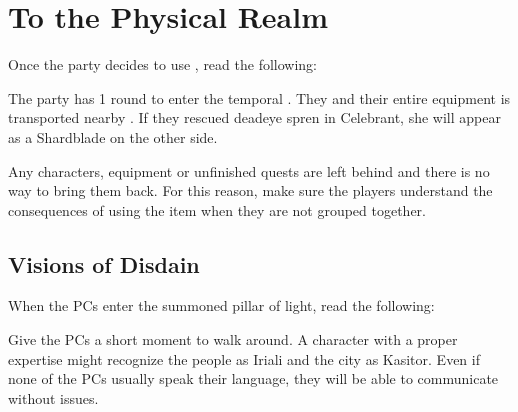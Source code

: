 \section{To the Physical Realm}
\label{sec:toThePhysicalRealm}

Once the party decides to use \lootGateOpener{}, read the following:


The party has 1 round to enter the temporal \locationPerpendicularity{}. They and their entire equipment is transported nearby \locationKharbranth{}. If they rescued deadeye spren in Celebrant, she will appear as a Shardblade on the other side.

Any characters, equipment or unfinished quests are left behind and there is no way to bring them back. For this reason, make sure the players understand the consequences of using the item when they are not grouped together.





\subsection{Visions of Disdain}
\label{ssec:visionsExitShadesmar}

When the PCs enter the summoned pillar of light, read the following:


Give the PCs a short moment to walk around. A character with a proper expertise might recognize the people as Iriali and the city as Kasitor. Even if none of the PCs usually speak their language, they will be able to communicate without issues.

